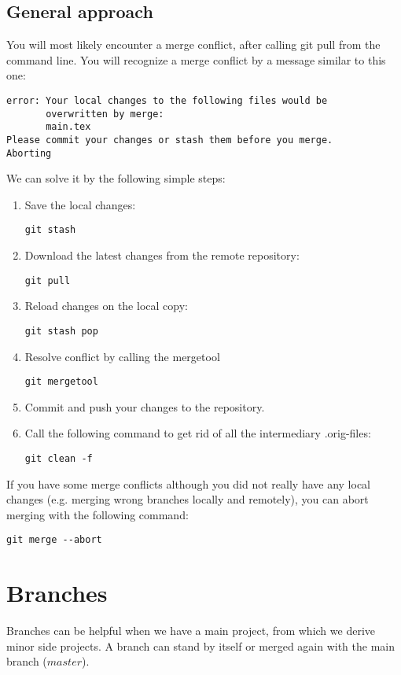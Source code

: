 \documentclass{report}
\begin{document}
\section{General approach}
You will most likely encounter a merge conflict, after calling git pull from the command line. You will recognize a merge conflict by a message similar to this one:
\begin{verbatim}
error: Your local changes to the following files would be 
       overwritten by merge:
       main.tex
Please commit your changes or stash them before you merge. 
Aborting
\end{verbatim}
We can solve it by the following simple steps:
\begin{enumerate}[noitemsep]
    \item Save the local changes:
    \begin{verbatim}
git stash
    \end{verbatim}
    \item  Download the latest changes from the remote repository:
    \begin{verbatim}
git pull
    \end{verbatim}
    \item Reload changes on the local copy:
    \begin{verbatim}
git stash pop
    \end{verbatim}
    \item Resolve conflict by calling the mergetool
    \begin{verbatim}
git mergetool
    \end{verbatim}
    \item Commit and push your changes to the repository.
    \item Call the following command to get rid of all the intermediary .orig-files:
    \begin{verbatim}
git clean -f
    \end{verbatim}
\end{enumerate}

If you have some merge conflicts although you did not really have any local changes (e.g. merging wrong branches locally and remotely), you can abort merging with the following command:
\begin{verbatim}
git merge --abort
\end{verbatim}

\chapter{Branches}
Branches can be helpful when we have a main project, from which we derive minor side projects. A branch can stand by itself or merged again with the main branch ($master$).
\end{document}
